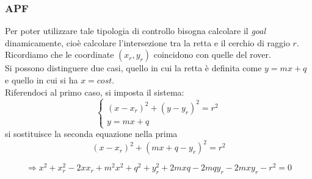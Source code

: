 \subsubsection{APF}
Per poter utilizzare tale tipologia di controllo bisogna calcolare il \textit{goal} dinamicamente, cioè calcolare l'intersezione tra la retta e il cerchio di raggio $r$. Ricordiamo che le coordinate $(x_r,y_r)$ coincidono con quelle del rover. \\
Si possono distinguere due casi, quello in cui la retta è definita come $y=mx+q$ e quello in cui si ha $x=cost$.\\
Riferendoci al primo caso, si imposta il sistema:
\begin{equation} 
\begin{cases}

    (x-x_r)^2+(y-y_r)^2=r^2
   \\
    y=mx+q 
  \end{cases} 
\end{equation}
si sostituisce la seconda equazione nella prima
\begin{equation*}
(x-x_r)^2+(mx+q-y_r)^2=r^2
\end{equation*}

\begin{equation}
\Rightarrow x^2+x_r^2-2xx_r+m^2x^2+q^2+y_r^2+2mxq-2mqy_r-2mxy_r-r^2=0
\end{equation}

